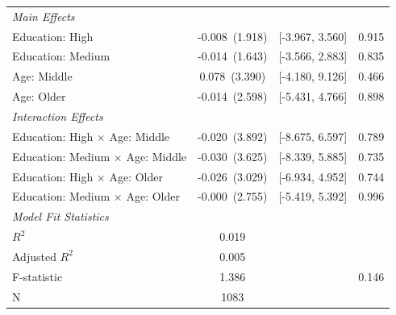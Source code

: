 \documentclass[11pt,a4paper]{article}
\begin{document}
\begin{table}[!htbp]
\begin{tabular}{p{5.5cm} c c c}
\addlinespace[0.3em]
\textit{Main Effects} & & & \\
\addlinespace[0.3em]
\hspace{1.5em}Education: High & -0.008~(1.918) & {[-3.967, 3.560]} & 0.915 \\
\hspace{1.5em}Education: Medium & -0.014~(1.643) & {[-3.566, 2.883]} & 0.835 \\
\hspace{1.5em}Age: Middle & 0.078~(3.390) & {[-4.180, 9.126]} & 0.466 \\
\hspace{1.5em}Age: Older & -0.014~(2.598) & {[-5.431, 4.766]} & 0.898 \\
\textit{Interaction Effects} & & & \\
\addlinespace[0.3em]
\hspace{1.5em}Education: High $\times$ Age: Middle & -0.020~(3.892) & {[-8.675, 6.597]} & 0.789 \\
\hspace{1.5em}Education: Medium $\times$ Age: Middle & -0.030~(3.625) & {[-8.339, 5.885]} & 0.735 \\
\hspace{1.5em}Education: High $\times$ Age: Older & -0.026~(3.029) & {[-6.934, 4.952]} & 0.744 \\
\hspace{1.5em}Education: Medium $\times$ Age: Older & -0.000~(2.755) & {[-5.419, 5.392]} & 0.996 \\
\textit{Model Fit Statistics} & & & \\
\addlinespace[0.3em]
\hspace{1.5em}$R^2$ & 0.019 & & \\
\hspace{1.5em}Adjusted $R^2$ & 0.005 & & \\
\hspace{1.5em}F-statistic & 1.386 & & 0.146 \\
\hspace{1.5em}N & 1083 & & \\
\bottomrule
\end{tabular}
\end{table}
\end{document}
